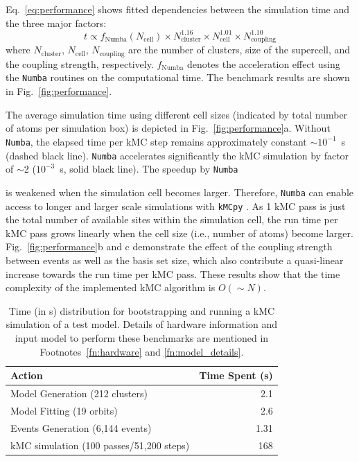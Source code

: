 \documentclass[a4paper,fleqn]{cas-dc}
\begin{document}
{Eq.~{\ref{eq:performance}} shows fitted dependencies between the simulation time and the three major factors:
%
\begin{equation}
t\propto f_\mathrm{Numba}(N_\mathrm{cell})\times {N}_\mathrm{cluster}^{1.16}\times N^{1.01}_\mathrm{cell} \times {N^{1.10}_\mathrm{coupling}}
  \label{eq:performance}
\end{equation}
%
where $N_\mathrm{cluster}$, $N_\mathrm{cell}$, $N_\mathrm{coupling}$ are the number of clusters, size of the supercell, and the coupling strength, respectively. $f_\mathrm{Numba}$ denotes the acceleration effect  using the  \texttt{Numba} routines on the computational time. The benchmark results are shown in Fig.~\ref{fig:performance}. 

The average simulation time using different cell sizes (indicated by total number of atoms per simulation box) is depicted in Fig.~\ref{fig:performance}a. Without \texttt{Numba}, the elapsed time  per kMC step remains approximately constant $\sim 10^{-1}$~s (dashed black line). \texttt{Numba} accelerates significantly the kMC simulation by factor of $\sim$2 ($10^{-3}$~s, solid black line). The speedup by {\texttt{Numba}}} is weakened when the simulation cell becomes larger. Therefore,  {\texttt{Numba}} can enable access to longer and larger scale simulations with \texttt{kMCpy} \cite{deng_fundamental_2022}.  As 1 kMC pass is just the total number of available sites within the simulation cell, the run time per kMC pass grows linearly when the cell size (i.e., number of atoms) become larger. Fig.~\ref{fig:performance}b and c demonstrate the effect of the coupling strength between events as well as the basis set size, which also contribute a quasi-linear increase towards the run time per kMC pass. These results show that the time complexity of the implemented kMC algorithm is $O(\sim N)$.

\begin{table}[!h]
    \centering
    \caption{Time (in s) distribution for bootstrapping and running a kMC simulation of a test model. Details of hardware information and input model to perform these benchmarks are mentioned in Footnotes~\ref{fn:hardware} and \ref{fn:model_details}.}
    \begin{tabular}{lr}
    \hline
        Action & Time Spent (s) \\ \hline
        Model Generation (212 clusters) & 2.1 \\ 
        Model Fitting (19 orbits) & 2.6 \\ 
        Events Generation (6,144 events) & 1.31 \\ 
        kMC simulation (100 passes/51,200 steps) & 168 \\ \hline
    \end{tabular}
    \label{tab:performante}
\end{table}
\end{document}
